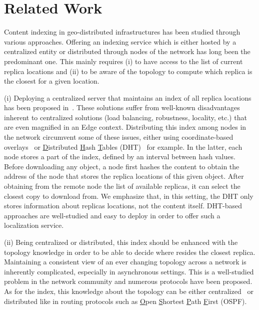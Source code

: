 
\section{Related Work}
\label{sec:related_work}

Content indexing in geo-distributed infrastructures has been studied
through various approaches.  Offering an indexing service which is
either hosted by a centralized entity or distributed through nodes of
the network has long been the predominant one. This mainly requires
(i) to have access to the list of current replica locations and (ii)
to be aware of the topology to compute which replica is the closest
for a given location.

(i) Deploying a centralized server that maintains an index of all
replica locations has been proposed in~\cite{snamp, p2p-oracle,
  fogstore, p2p-alto}. These solutions suffer from well-known
disadvantages inherent to centralized solutions (load balancing,
robustness, locality, etc.) that are even magnified in an Edge
context.  Distributing this index among nodes in the network
circumvent some of these issues, either using coordinate-based
overlays~\cite{voronet, coin_19} or \underline{D}istributed
\underline{H}ash \underline{T}ables (DHT)~\cite{ipfs, mdht, squirrel}
for example. In the latter, each node stores a part of the index,
defined by an interval between hash values.  Before downloading any
object, a node first hashes the content to obtain the address of the
node that stores the replica locations of this given object. After
obtaining from the remote node the list of available replicas, it can
select the closest copy to download from. We emphasize that, in this
setting, the DHT only stores information about replicas locations, not
the content itself. DHT-based approaches are well-studied and easy to
deploy in order to offer such a localization service.


(ii) Being centralized or distributed, this index should be enhanced
with the topology knowledge in order to be able to decide where
resides the closest replica. Maintaining a consistent view of an ever
changing topology across a network is inherently complicated,
especially in asynchronous settings. This is a well-studied problem in
the network community and numerous protocols have been proposed. As
for the index, this knowledge about the topology can be either
centralized~\cite{topology-discovery} or distributed like in routing
protocols such as \underline{O}pen \underline{S}hortest
\underline{P}ath \underline{F}irst (OSPF).


